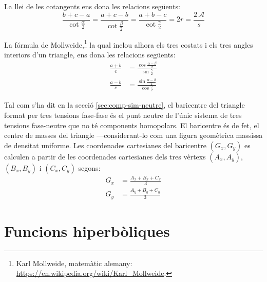 La llei de les cotangents ens dona les relacions següents:
\begin{equation}
    \frac{b+c-a}{\cot\frac{\alpha}{2}} = \frac{a+c-b}{\cot\frac{\beta}{2}} =
    \frac{a+b-c}{\cot\frac{\gamma}{2}} = 2 r = \frac{2\,\mathscr{A} }{s}
\end{equation}

La fórmula de Mollweide,\footnote{Karl Mollweide, matemàtic alemany: \href{https://en.wikipedia.org/wiki/Karl_Mollweide}{https:/\!\!/en.wikipedia.org/wiki/Karl\_Mollweide}.} la qual inclou alhora els tres costats i els tres angles interiors d'un triangle, ens dona les relacions següents:
\begin{subequations}
\begin{align}
    \frac{a+b}{c} &= \frac{\cos\frac{\alpha-\beta}{2}}{\sin\frac{\gamma}{2}} \\[1ex]
    \frac{a-b}{c} &= \frac{\sin\frac{\alpha-\beta}{2}}{\cos\frac{\gamma}{2}}
\end{align}
\end{subequations}

Tal com s'ha dit en la secció \vref{sec:comp-sim-neutre}, el baricentre del triangle format per tres tensions fase-fase és el punt neutre de l'únic sistema de tres tensions fase-neutre que no té components homopolars. El baricentre és de fet, el centre de masses del triangle ---considerant-lo com una figura geomètrica massissa de densitat uniforme.  Les coordenades cartesianes del baricentre $(G_x,G_y)$ es calculen a partir de les coordenades cartesianes dels tres vèrtexs $(A_x,A_y)$, $(B_x,B_y)$ i $(C_x,C_y)$ segons:
\begin{subequations}
\begin{align}
    G_x &= \frac{A_x + B_x + C_x}{3} \label{eq:bari_x}\\[1ex]
    G_y &= \frac{A_y + B_y + C_y}{3} \label{eq:bari_y}
\end{align}
\end{subequations}


\section{Funcions hiperbòliques}

